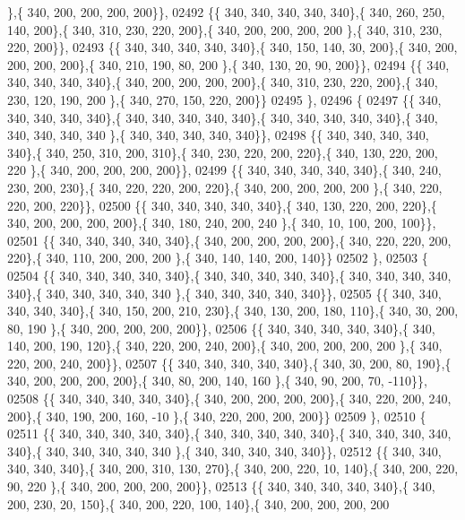 \begin{DoxyCode}
      \},\{ 340, 200, 200, 200, 200\}\},
02492 \{\{ 340, 340, 340, 340, 340\},\{ 340, 260, 250, 140, 200\},\{ 340, 310, 230, 220, 200\},\{ 340, 200, 200, 200, 200
      \},\{ 340, 310, 230, 220, 200\}\},
02493 \{\{ 340, 340, 340, 340, 340\},\{ 340, 150, 140,  30, 200\},\{ 340, 200, 200, 200, 200\},\{ 340, 210, 190,  80, 200
      \},\{ 340, 130,  20,  90, 200\}\},
02494 \{\{ 340, 340, 340, 340, 340\},\{ 340, 200, 200, 200, 200\},\{ 340, 310, 230, 220, 200\},\{ 340, 230, 120, 190, 200
      \},\{ 340, 270, 150, 220, 200\}\}
02495 \},
02496 \{
02497 \{\{ 340, 340, 340, 340, 340\},\{ 340, 340, 340, 340, 340\},\{ 340, 340, 340, 340, 340\},\{ 340, 340, 340, 340, 340
      \},\{ 340, 340, 340, 340, 340\}\},
02498 \{\{ 340, 340, 340, 340, 340\},\{ 340, 250, 310, 200, 310\},\{ 340, 230, 220, 200, 220\},\{ 340, 130, 220, 200, 220
      \},\{ 340, 200, 200, 200, 200\}\},
02499 \{\{ 340, 340, 340, 340, 340\},\{ 340, 240, 230, 200, 230\},\{ 340, 220, 220, 200, 220\},\{ 340, 200, 200, 200, 200
      \},\{ 340, 220, 220, 200, 220\}\},
02500 \{\{ 340, 340, 340, 340, 340\},\{ 340, 130, 220, 200, 220\},\{ 340, 200, 200, 200, 200\},\{ 340, 180, 240, 200, 240
      \},\{ 340,  10, 100, 200, 100\}\},
02501 \{\{ 340, 340, 340, 340, 340\},\{ 340, 200, 200, 200, 200\},\{ 340, 220, 220, 200, 220\},\{ 340, 110, 200, 200, 200
      \},\{ 340, 140, 140, 200, 140\}\}
02502 \},
02503 \{
02504 \{\{ 340, 340, 340, 340, 340\},\{ 340, 340, 340, 340, 340\},\{ 340, 340, 340, 340, 340\},\{ 340, 340, 340, 340, 340
      \},\{ 340, 340, 340, 340, 340\}\},
02505 \{\{ 340, 340, 340, 340, 340\},\{ 340, 150, 200, 210, 230\},\{ 340, 130, 200, 180, 110\},\{ 340,  30, 200,  80, 190
      \},\{ 340, 200, 200, 200, 200\}\},
02506 \{\{ 340, 340, 340, 340, 340\},\{ 340, 140, 200, 190, 120\},\{ 340, 220, 200, 240, 200\},\{ 340, 200, 200, 200, 200
      \},\{ 340, 220, 200, 240, 200\}\},
02507 \{\{ 340, 340, 340, 340, 340\},\{ 340,  30, 200,  80, 190\},\{ 340, 200, 200, 200, 200\},\{ 340,  80, 200, 140, 160
      \},\{ 340,  90, 200,  70, -110\}\},
02508 \{\{ 340, 340, 340, 340, 340\},\{ 340, 200, 200, 200, 200\},\{ 340, 220, 200, 240, 200\},\{ 340, 190, 200, 160, -10
      \},\{ 340, 220, 200, 200, 200\}\}
02509 \},
02510 \{
02511 \{\{ 340, 340, 340, 340, 340\},\{ 340, 340, 340, 340, 340\},\{ 340, 340, 340, 340, 340\},\{ 340, 340, 340, 340, 340
      \},\{ 340, 340, 340, 340, 340\}\},
02512 \{\{ 340, 340, 340, 340, 340\},\{ 340, 200, 310, 130, 270\},\{ 340, 200, 220,  10, 140\},\{ 340, 200, 220,  90, 220
      \},\{ 340, 200, 200, 200, 200\}\},
02513 \{\{ 340, 340, 340, 340, 340\},\{ 340, 200, 230,  20, 150\},\{ 340, 200, 220, 100, 140\},\{ 340, 200, 200, 200, 200

\end{DoxyCode}
